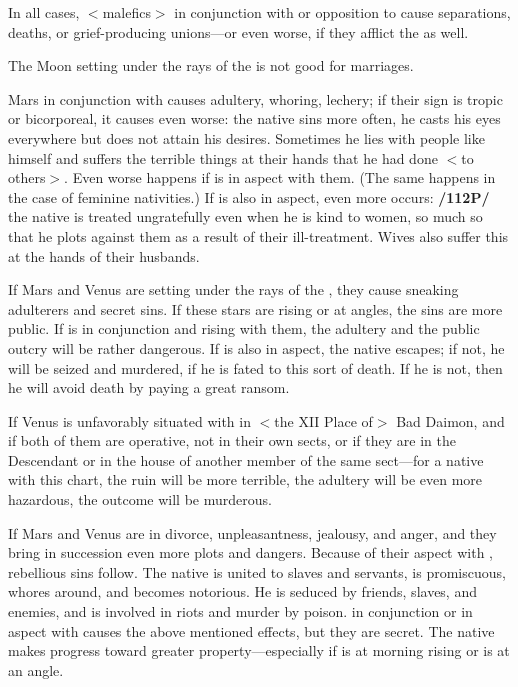 In all cases, $<$malefics$>$ in conjunction with or opposition to \Venus\xspace cause separations, deaths, or grief-producing unions—or even worse, if they afflict the \Moon\xspace as well.

The Moon setting under the rays of the \Sun\xspace is not good for marriages. 

Mars in conjunction with \Mercury\xspace causes adultery, whoring, lechery; if their sign is tropic or bicorporeal, it causes even worse: the native sins more often, he casts his eyes everywhere but does not attain his desires. Sometimes he lies with people like himself and suffers the terrible things at their hands that he had done $<$to others$>$. Even
worse happens if \Mercury\xspace is in aspect with them. (The same happens in the case of feminine nativities.) If \Saturn\xspace is also in aspect, even more occurs: \textbf{/112P/} the native is treated ungratefully even when he is kind to women, so much so that he plots against them as a result of their ill-treatment. Wives also suffer this at the hands of their husbands.

If Mars and Venus are setting under the rays of the \Sun, they cause sneaking adulterers and secret sins.
If these stars are rising or at angles, the sins are more public. If \Mercury\xspace is in conjunction and rising with
them, the adultery and the public outcry will be rather dangerous. If \Jupiter\xspace is also in aspect, the native
escapes; if not, he will be seized and murdered, if he is fated to this sort of death. If he is not, then he will
avoid death by paying a great ransom. 

If Venus is unfavorably situated with \Mars\xspace in $<$the XII Place of$>$ Bad Daimon, and if both of them are operative, not in their own sects, or if they are in the Descendant or in the house of another member of the same sect—for a native with this chart, the ruin will be more terrible,
the adultery will be even more hazardous, the outcome will be murderous. 

If Mars and Venus are in divorce, unpleasantness, jealousy, and anger, and they bring in succession even more plots and dangers. Because of their aspect with \Mercury, rebellious sins follow. The native is united to slaves and servants, is promiscuous, whores around, and becomes notorious. He is seduced by friends, slaves, and enemies, and is involved in riots and murder by poison.
\Jupiter\xspace in conjunction or in aspect with \Venus\xspace causes the above mentioned effects, but they are secret. The native makes progress toward greater property—especially if \Jupiter\xspace is at morning rising or is at an angle.

